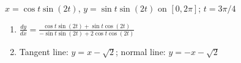 {$x=\cos t\sin(2t)$, $y=\sin t\sin(2t)$ on $[0,2\pi]$; \quad $t=3\pi/4$}
{\begin{enumerate}
	\item $\frac{dy}{dx} = \frac{\cos t\sin(2t)+\sin t\cos(2t)}{-\sin t\sin(2t)+2\cos t\cos(2t)}$
	\item	Tangent line: $y=x-\sqrt{2}$; normal line: $y=-x-\sqrt{2}$
\end{enumerate}
}
